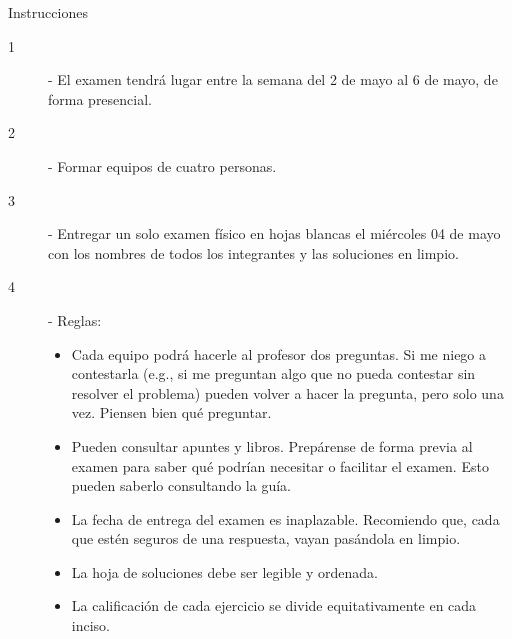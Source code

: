 \documentclass[12pt]{scrartcl} %
\begin{document}
\begin{summarybox}{Instrucciones}
    \begin{description} %
      \item[1] - El examen tendrá lugar entre la semana del 2 de mayo al 6 de mayo, de forma presencial.
      \item[2] - Formar equipos de cuatro personas. 
      \item[3] - Entregar un solo examen físico en hojas blancas el miércoles 04 de mayo con los nombres de todos los integrantes y las soluciones en limpio. 
      \item[4] - Reglas:
     \begin{itemize}
       \setlength{\itemsep}{0pt}
       \setlength{\parskip}{0pt}
       \setlength{\parsep}{0pt}
       \item Cada equipo podrá hacerle al profesor dos preguntas. Si me niego a contestarla (e.g., si me preguntan algo que no pueda contestar sin resolver el problema) pueden volver a hacer la pregunta, pero solo una vez. Piensen bien qué preguntar.
       \item Pueden consultar apuntes y libros. Prepárense de forma previa al examen para saber qué podrían necesitar o facilitar el examen. Esto pueden saberlo consultando la guía. 
       \item La fecha de entrega del examen es inaplazable. Recomiendo que, cada que estén seguros de una respuesta, vayan pasándola en limpio.
       \item La hoja de soluciones debe ser legible y ordenada.
       \item La calificación de cada ejercicio se divide equitativamente en cada inciso.
     \end{itemize}   
      
    \end{description}

\end{summarybox}

\begin{center}
  \Coffeecup[1.5]
\end{center}
\end{document}
